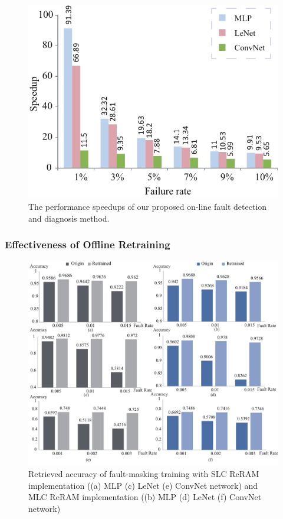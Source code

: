 \begin{figure}
    \centering
    \includegraphics[width=0.6\linewidth]{images/OL-fig14}
    \caption{The performance speedups of our proposed on-line fault detection and diagnosis method.}
    \label{fig:aetperformancecompare}
\end{figure}

\subsubsection{Effectiveness of Offline Retraining}
\begin{figure}
    \centering
    \includegraphics[width=0.95\linewidth]{images/OL-fig15}
    \caption{ Retrieved accuracy of fault-masking training with SLC ReRAM implementation ((a) MLP (c) LeNet (e) ConvNet network) and MLC ReRAM implementation ((b) MLP (d) LeNet (f) ConvNet network)}
    \label{fig:retraining}
\end{figure}



